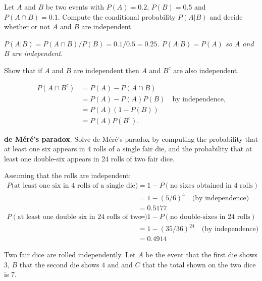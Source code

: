 \begin{exercise}
\begin{questions}
\question %
Let $A$ and $B$ be two events with $P(A)=0.2$, $P(B)=0.5$ and $P(A\cap B)=0.1$. Compute the conditional probability $P(A|B)$ and decide whether or not $A$ and $B$ are independent.
\begin{answer}
\bit
\it $P(A|B)   = P(A\cap B)/P(B) = 0.1/0.5 = 0.25$.
\it $P(A|B)=P(A)$ so $A$ and $B$ are independent.
\eit
\end{answer}

\question %
Show that if $A$ and $B$ are independent then $A$ and $B^c$ are also independent.
\begin{answer}
\begin{align*}
P(A\cap B^c) 
	& = P(A) - P(A\cap B) \\
	& = P(A) - P(A)P(B) \quad\text{by independence,} \\
	& = P(A)(1-P(B)) \\
	& = P(A)P(B^c).
\end{align*}
\end{answer}

\question %
\textbf{de M\'{e}r\'{e}'s paradox}. Solve de M\'{e}r\'{e}'s paradox by computing the probability that at least one six appears in 4 rolls of a single fair die, and the probability that at least one double-six appears in 24 rolls of two fair dice. 
\begin{answer}
Assuming that the rolls are independent:
\begin{align*}
P(\text{at least one six in 4 rolls of a single die)}
	& = 1- P(\text{no sixes obtained in 4 rolls}) \\
	& = 1 - (5/6)^4 \quad\text{(by independence)} \\
	& = 0.5177 \\
P(\text{at least one double six in 24 rolls of two dice}) 
	& = 1- P(\text{no double-sixes in 24 rolls}) \\
	& = 1 - (35/36)^{24} \quad\text{(by independence)} \\
	& = 0.4914
\end{align*}
\end{answer}

\question %
Two fair dice are rolled independently. Let $A$ be the event that the first die shows $3$, $B$ that the second die shows $4$ and and $C$ that the total shown on the two dice is $7$.
\begin{parts}

\end{parts}
\end{questions}
\end{exercise}
